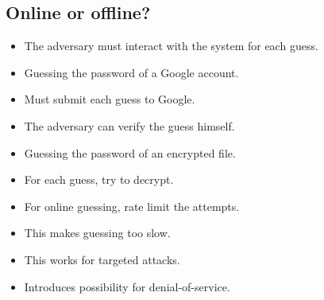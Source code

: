 \subsection{Online or offline?}

\begin{frame}
  \begin{definition}[Online]
    \begin{itemize}
      \item The adversary must interact with the system for each guess.
    \end{itemize}
  \end{definition}

  \pause

  \begin{example}[Online]
    \begin{itemize}
      \item Guessing the password of a Google account.
      \item Must submit each guess to Google.
    \end{itemize}
  \end{example}
\end{frame}

\begin{frame}
  \begin{definition}[Offline]
    \begin{itemize}
      \item The adversary can verify the guess himself.
    \end{itemize}
  \end{definition}

  \pause

  \begin{example}[Offline]
    \begin{itemize}
      \item Guessing the password of an encrypted file.
      \item For each guess, try to decrypt.
    \end{itemize}
  \end{example}
\end{frame}

\begin{frame}
  \begin{solution}
    \begin{itemize}
      \item For online guessing, rate limit the attempts.
      \item This makes guessing too slow.
    \end{itemize}
  \end{solution}

  \pause

  \begin{remark}
    \begin{itemize}
      \item This works for targeted attacks.
      \item Introduces possibility for denial-of-service.
    \end{itemize}
  \end{remark}
\end{frame}

